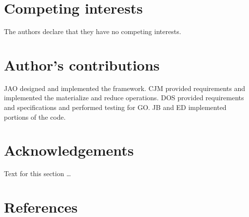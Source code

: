 \documentclass{bmcart}
\begin{document}
\begin{backmatter}

\section*{Competing interests}
  The authors declare that they have no competing interests.

\section*{Author's contributions}

JAO designed and implemented the framework. CJM provided requirements
and implemented the materialize and reduce operations. DOS provided
requirements and specifications and performed testing for GO. JB and
ED implemented portions of the code.

\section*{Acknowledgements}
  Text for this section \ldots

\section*{References}





\end{backmatter}
\end{document}
